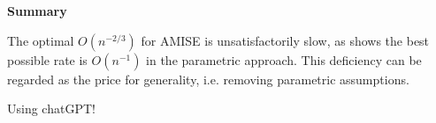 \documentclass[19pt,landscape]{article}
\begin{document}
\newpage
{\LARGE\centerline{\textbf{Summary}}}
\vskip25pt
\begin{minipage}{.9\textwidth}
    \Large 
    The optimal $O(n^{-2/3})$ for AMISE is unsatisfactorily slow, as \cite{boydsteele78} shows the best possible rate is $O(n^{-1})$ in the parametric approach. This deficiency can be regarded as the price for generality, i.e. removing parametric assumptions.  

    \vskip 10pt
    {\huge Using chatGPT!}
\end{minipage}








\end{document}
